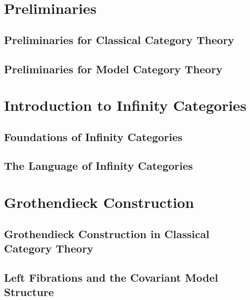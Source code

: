 \documentclass[12pt]{report}
\begin{document}


\setcounter{section}{-1}

\section{Preliminaries}

\subsection{Preliminaries for Classical Category Theory}



\subsection{Preliminaries for Model Category Theory}



\section{Introduction to Infinity Categories}

\subsection{Foundations of Infinity Categories}



\subsection{The Language of Infinity Categories}



\section{Grothendieck Construction}

\setcounter{subsection}{-1}

\subsection{Grothendieck Construction in Classical Category Theory}



\subsection{Left Fibrations and the Covariant Model Structure}
\end{document}
